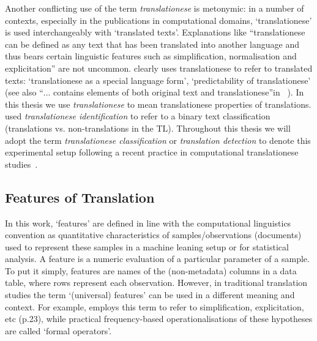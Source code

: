 Another conflicting use of the term \textit{translationese} is metonymic: in a number of contexts, especially in the publications in computational domains, `translationese' is used interchangeably with `translated texts'. Explanations like ``translationese can be defined as any text that has been translated into another language and thus bears certain linguistic features such as simplification, normalisation and explicitation'' are not uncommon. \citet{Nikolaev2020} clearly uses translationese to refer to translated texts: `translationese as a special language form', `predictability of translationese' (see also ``$\dots$ contains elements of both original text and translationese''in ~\citet[p.52]{Carter2012}). 
In this thesis we use \textit{translationese} to mean translationese properties of translations.
\citet{Popescu2011} used \textit{translationese identification} to refer to a binary text classification (translations vs. non-translations in the TL). Throughout this thesis we will adopt the term \textit{translationese classification} or \textit{translation detection} to denote this experimental setup following a recent practice in computational translationese studies~\cite{Pylypenko2021}. 

\subsection{\label{ssec:feats}Features of Translation}
In this work, `features' are defined in line with the computational linguistics convention as quantitative characteristics of samples/observations (documents) used to represent these samples in a machine leaning setup or for statistical analysis. A feature is a numeric evaluation of a particular parameter of a sample. To put it simply, features are names of the (non-metadata) columns in a data table, where rows represent each observation.
However, in traditional translation studies the term `(universal) features' can be used in a different meaning and context. For example, \citet{Zanettin2013} employs this term to refer to simplification, explicitation, etc (p.23), while practical frequency-based operationalisations of these hypotheses are called `formal operators'. 


